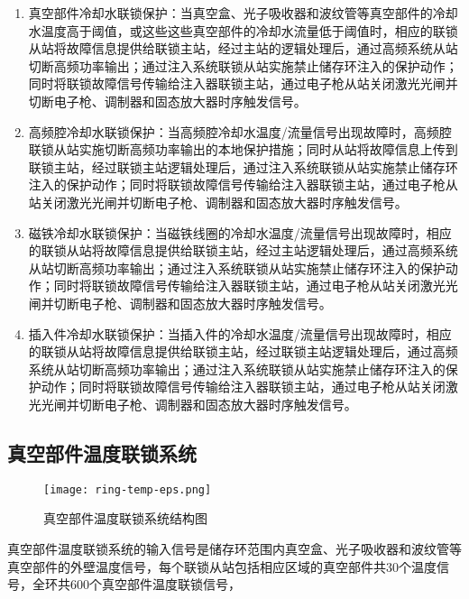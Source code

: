 \begin{enumerate}

  \item 真空部件冷却水联锁保护：当真空盒、光子吸收器和波纹管等真空部件的冷却水温度高于阈值，或这些这些真空部件的冷却水流量低于阈值时，相应的联锁从站将故障信息提供给联锁主站，经过主站的逻辑处理后，通过高频系统从站切断高频功率输出；通过注入系统联锁从站实施禁止储存环注入的保护动作；同时将联锁故障信号传输给注入器联锁主站，通过电子枪从站关闭激光光闸并切断电子枪、调制器和固态放大器时序触发信号。

  \item 高频腔冷却水联锁保护：当高频腔冷却水温度/流量信号出现故障时，高频腔联锁从站实施切断高频功率输出的本地保护措施；同时从站将故障信息上传到联锁主站，经过联锁主站逻辑处理后，通过注入系统联锁从站实施禁止储存环注入的保护动作；同时将联锁故障信号传输给注入器联锁主站，通过电子枪从站关闭激光光闸并切断电子枪、调制器和固态放大器时序触发信号。

  \item 磁铁冷却水联锁保护：当磁铁线圈的冷却水温度/流量信号出现故障时，相应的联锁从站将故障信息提供给联锁主站，经过主站逻辑处理后，通过高频系统从站切断高频功率输出；通过注入系统联锁从站实施禁止储存环注入的保护动作；同时将联锁故障信号传输给注入器联锁主站，通过电子枪从站关闭激光光闸并切断电子枪、调制器和固态放大器时序触发信号。

  \item 插入件冷却水联锁保护：当插入件的冷却水温度/流量信号出现故障时，相应的联锁从站将故障信息提供给联锁主站，经过联锁主站逻辑处理后，通过高频系统从站切断高频功率输出；通过注入系统联锁从站实施禁止储存环注入的保护动作；同时将联锁故障信号传输给注入器联锁主站，通过电子枪从站关闭激光光闸并切断电子枪、调制器和固态放大器时序触发信号。

\end{enumerate}

\subsection{真空部件温度联锁系统}

\begin{figure}[!htb]
	\centering
	\texttt{[image: ring-temp-eps.png]}
	\caption{真空部件温度联锁系统结构图}
	\label{fig:ring-temp-eps}
\end{figure}

真空部件温度联锁系统的输入信号是储存环范围内真空盒、光子吸收器和波纹管等真空部件的外壁温度信号，每个联锁从站包括相应区域的真空部件共30个温度信号，全环共600个真空部件温度联锁信号，

